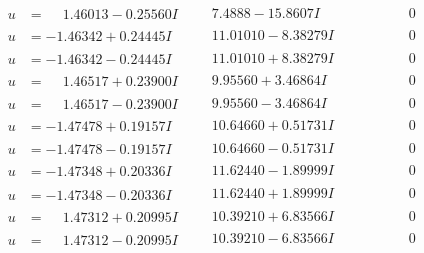 \documentclass[1p]{elsarticle_modified}
\theoremstyle{definition}
\begin{document}
$$\begin{array}{c|c|c}
\begin{aligned}
u &= \phantom{-}1.46013 - 0.25560 I\end{aligned}
 & \phantom{-}7.4888 - 15.8607 I & \phantom{-0.000000 } 0 \\ \hline\begin{aligned}
u &= -1.46342 + 0.24445 I\end{aligned}
 & \phantom{-}11.01010 - 8.38279 I & \phantom{-0.000000 } 0 \\ \hline\begin{aligned}
u &= -1.46342 - 0.24445 I\end{aligned}
 & \phantom{-}11.01010 + 8.38279 I & \phantom{-0.000000 } 0 \\ \hline\begin{aligned}
u &= \phantom{-}1.46517 + 0.23900 I\end{aligned}
 & \phantom{-}9.95560 + 3.46864 I & \phantom{-0.000000 } 0 \\ \hline\begin{aligned}
u &= \phantom{-}1.46517 - 0.23900 I\end{aligned}
 & \phantom{-}9.95560 - 3.46864 I & \phantom{-0.000000 } 0 \\ \hline\begin{aligned}
u &= -1.47478 + 0.19157 I\end{aligned}
 & \phantom{-}10.64660 + 0.51731 I & \phantom{-0.000000 } 0 \\ \hline\begin{aligned}
u &= -1.47478 - 0.19157 I\end{aligned}
 & \phantom{-}10.64660 - 0.51731 I & \phantom{-0.000000 } 0 \\ \hline\begin{aligned}
u &= -1.47348 + 0.20336 I\end{aligned}
 & \phantom{-}11.62440 - 1.89999 I & \phantom{-0.000000 } 0 \\ \hline\begin{aligned}
u &= -1.47348 - 0.20336 I\end{aligned}
 & \phantom{-}11.62440 + 1.89999 I & \phantom{-0.000000 } 0 \\ \hline\begin{aligned}
u &= \phantom{-}1.47312 + 0.20995 I\end{aligned}
 & \phantom{-}10.39210 + 6.83566 I & \phantom{-0.000000 } 0 \\ \hline\begin{aligned}
u &= \phantom{-}1.47312 - 0.20995 I\end{aligned}
 & \phantom{-}10.39210 - 6.83566 I & \phantom{-0.000000 } 0 \\ \hline\begin{aligned}

\end{aligned}
\end{array}$$
\end{document}
